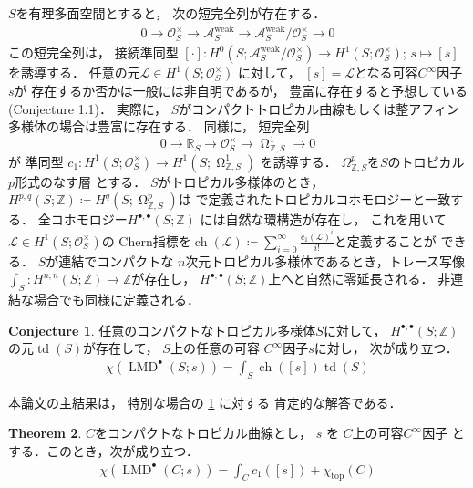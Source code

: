 \documentclass[uplatex,dvipdfmx,12pt]{jsarticle}
\numberwithin{equation}{section}
\theoremstyle{definition}
\newtheorem{theorem}{Theorem}[section]
\newtheorem{conjecture}[theorem]{Conjecture}
\newcommand{\deq}{\coloneqq}
\newcommand{\opn}[1]{\operatorname{#1}}
\DeclareMathOperator{\tform}{\Omega}
\begin{document}
$S$を有理多面空間とすると，
次の短完全列が存在する．
\begin{align}
0\to \mathcal{O}_S^{\times} \to 
\mathcal{A}^{\mathrm{weak}}_S \to 
\mathcal{A}^{\mathrm{weak}}_S/\mathcal{O}_S^{\times}
\to 0
\end{align}
この短完全列は，
接続準同型
$
[\cdot] \colon 
H^{0}(S;\mathcal{A}^{\mathrm{weak}}_S/\mathcal{O}_S^{\times})
\to H^{1}(S;\mathcal{O}_S^{\times})
$;
$
s\mapsto [s]
$
を誘導する．
任意の元$\mathcal{L}\in H^{1}(S;\mathcal{O}^{\times}_S)$
に対して，
$[s]=\mathcal{L}$となる可容$C^{\infty}$因子
$s$が
存在するか否かは一般には非自明であるが，
豊富に存在すると予想している(Conjecture 1.1)．
実際に，
$S$がコンパクトトロピカル曲線もしくは整アフィン多様体の場合は豊富に存在する．
同様に，
短完全列
\begin{equation}
0
\to \mathbb{R}_S
\to \mathcal{O}^{\times}_S
\to \tform_{\mathbb{Z},S}^{1}
\to 0
\end{equation}
が
準同型
$
c_1\colon H^{1}(S;\mathcal{O}^{\times}_S)
\to H^{1}(S;\tform_{\mathbb{Z},S}^{1})
$
を誘導する．
$\Omega_{\mathbb{Z},S}^{p}$を$S$のトロピカル$p$形式のなす層
とする\cite{gross2019sheaftheoretic}．
$S$がトロピカル多様体のとき，
$H^{p,q}(S;\mathbb{Z})\deq H^{q}(S;\tform_{\mathbb{Z},S}^{p})$は
\cite{mikhalkinTropicalEigenwaveIntermediate2014a}
で定義されたトロピカルコホモロジーと一致する．
全コホモロジー$H^{\bullet,\bullet}(S;\mathbb{Z})$
には自然な環構造が存在し，
これを用いて
$\mathcal{L}\in H^{1}(S;\mathcal{O}_S^{\times})$の
Chern指標を$\opn{ch}(\mathcal{L})\deq
\sum_{i=0}^{\infty}\frac{c_1(\mathcal{L})^{i}}{i!}$と定義することが
できる．
$S$が連結でコンパクトな
$n$次元トロピカル多様体であるとき，トレース写像
$\int_{S}\colon H^{n,n}(S;\mathbb{Z})\to \mathbb{Z}$が存在し，
$H^{\bullet,\bullet}(S;\mathbb{Z})$上へと自然に零延長される．
非連結な場合でも同様に定義される．
\setcounter{section}{1}
\setcounter{condition}{1}
\begin{conjecture} \label{conjecture-mirror-tropical-rr}
任意のコンパクトなトロピカル多様体$S$に対して，
$H^{\bullet,\bullet}(S;\mathbb{Z})$
の元$\opn{td}(S)$が存在して，
$S$上の任意の可容
$C^{\infty}$因子$s$に対し，
次が成り立つ．
\begin{align}
\chi(\opn{LMD}^{\bullet}(S;s))=
\int_{S}\opn{ch}([s])\opn{td}(S)
\end{align}
\end{conjecture}


本論文の主結果は，
特別な場合の
\cref{conjecture-mirror-tropical-rr}
に対する
肯定的な解答である．

\begin{theorem} \label{theorem-main-1}
$C$をコンパクトなトロピカル曲線とし，
$s$ を $C$上の可容$C^{\infty}$因子 
とする．このとき，次が成り立つ．
\begin{align}
\chi(\opn{LMD}^{\bullet}(C;s))=\int_C c_1([s])+
\chi_{\opn{top}}(C)
\end{align}
\end{theorem}
\end{document}
